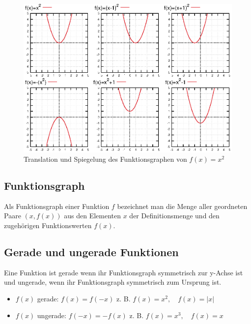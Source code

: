 \documentclass[a4paper]{article}
\begin{document}
\begin{figure}[h!]
\centering
\includegraphics[width=1\textwidth]{images/graph_transformation.eps}\caption{\label{fig:graph_translation}{Translation und Spiegelung des Funktionsgraphen von $f(x)=x^2$}}
\end{figure}

\subsection{Funktionsgraph}
Als Funktionsgraph einer Funktion $f$ bezeichnet man die Menge aller geordneten Paare $(x, f(x))$ aus den Elementen $x$ der Definitionsmenge und den zugehörigen Funktionswerten $f(x)$.

\subsection{Gerade und ungerade Funktionen}
Eine Funktion ist gerade wenn ihr Funktionsgraph symmetrisch zur y-Achse ist und ungerade, wenn ihr Funktionsgraph symmetrisch zum Ursprung ist.
\begin{itemize}
\item $f(x)$ gerade: $f(x)=f(-x)$ \quad z. B. $f(x)=x^2, \quad f(x)=|x|$
\item $f(x)$ ungerade: $f(-x)=-f(x)$  \quad z. B. $f(x)=x^3, \quad f(x)=x$
\end{itemize}
\end{document}
